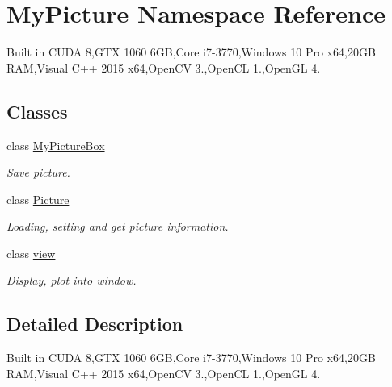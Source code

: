 \hypertarget{namespace_my_picture}{}\section{My\+Picture Namespace Reference}
\label{namespace_my_picture}


Built in C\+U\+DA 8,G\+TX 1060 6\+GB,Core i7-\/3770,Windows 10 Pro x64,20\+GB R\+AM,Visual C++ 2015 x64,Open\+CV 3.,Open\+CL 1.,Open\+GL 4.  


\subsection*{Classes}
\begin{DoxyCompactItemize}
\item 
class \hyperlink{class_my_picture_1_1_my_picture_box}{My\+Picture\+Box}
\begin{DoxyCompactList}\small\item\em Save picture. \end{DoxyCompactList}\item 
class \hyperlink{class_my_picture_1_1_picture}{Picture}
\begin{DoxyCompactList}\small\item\em Loading, setting and get picture information. \end{DoxyCompactList}\item 
class \hyperlink{class_my_picture_1_1view}{view}
\begin{DoxyCompactList}\small\item\em Display, plot into window. \end{DoxyCompactList}\end{DoxyCompactItemize}


\subsection{Detailed Description}
Built in C\+U\+DA 8,G\+TX 1060 6\+GB,Core i7-\/3770,Windows 10 Pro x64,20\+GB R\+AM,Visual C++ 2015 x64,Open\+CV 3.,Open\+CL 1.,Open\+GL 4. 